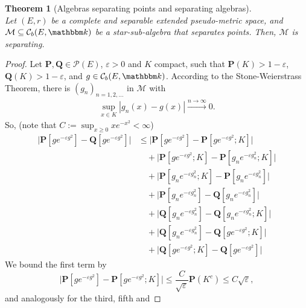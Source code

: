 \documentclass{article}
\newtheorem{theorem}{Theorem}
\theoremstyle{definition}
\theoremstyle{step} \newtheorem{step}{Step}
\begin{document}
\begin{theorem}[Algebras separating points and separating algebras]
  \label{T:wc3}\mbox{}\\ \sloppy Let $(E,r)$ be a complete and separable extended pseudo-metric space, and
  $\mathcal M \subseteq\mathcal C_b(E,\mathbbm k)$ be a
  star-sub-algebra that separates points. Then, $\mathcal M$ is
  separating.
\end{theorem}

\begin{proof}
  Let $\mathbf P, \mathbf Q\in\mathcal P(E)$, $\varepsilon>0$ and $K$
  compact, such that $\mathbf P(K)>1-\varepsilon$, $\mathbf
    Q(K)>1-\varepsilon$, and $g \in \mathcal C_b(E,\mathbbm k)$. According to the
  Stone-Weierstrass Theorem, there is $(g_n)_{n=1,2,\dots}$ in
  $\mathcal M$ with
  \begin{align}
    \label{eq:wc9}
    \sup_{x\in K} |g_n(x) - g(x)| \xrightarrow{n\to\infty} 0.
  \end{align}
  So, (note that $C := \sup_{x\geq 0} xe^{-x^2} < \infty$)
  \begin{align*}
    \big|\mathbf P[ge^{-\varepsilon g^2}] - \mathbf Q[ge^{-\varepsilon
    g^2}] \big| & \leq \big|\mathbf P[ge^{-\varepsilon g^2}] -
    \mathbf P[ge^{-\varepsilon g^2};K] \big|                   \\ & \quad {} + \big|\mathbf
    P[ge^{-\varepsilon g^2};K] - \mathbf P[g_ne^{-\varepsilon
    g_n^2};K] \big|                                            \\ & \quad {} + \big| \mathbf P[g_ne^{-\varepsilon
    g_n^2};K] - \mathbf P[g_ne^{-\varepsilon g_n^2}] \big|     \\ &
    \quad {} + |\mathbf P[g_ne^{-\varepsilon g_n^2}] - \mathbf
    Q[g_ne^{-\varepsilon g_n^2}] \big|                         \\ & \quad {} + \big|\mathbf
    Q[g_ne^{-\varepsilon g_n^2}] - \mathbf Q[g_ne^{-\varepsilon
    g_n^2};K] \big|                                            \\ & \quad {}  + \big|\mathbf Q[g_ne^{-\varepsilon
    g_n^2}] - \mathbf Q[ge^{-\varepsilon g^2};K] \big|         \\ & \quad{} {}  +
    \big|\mathbf Q[ge^{-\varepsilon g^2};K] - \mathbf
    Q[ge^{-\varepsilon g^2}] \big|
  \end{align*}
  We bound the first term by
  $$\big|\mathbf P[ge^{-\varepsilon g^2}] - \mathbf P[ge^{-\varepsilon
            g^2};K] \big| \leq \frac{C}{\sqrt{\varepsilon}} \mathbf P(K^c)
    \leq C\sqrt{\varepsilon},$$ and analogously for the third, fifth and

\end{proof}
\end{document}
